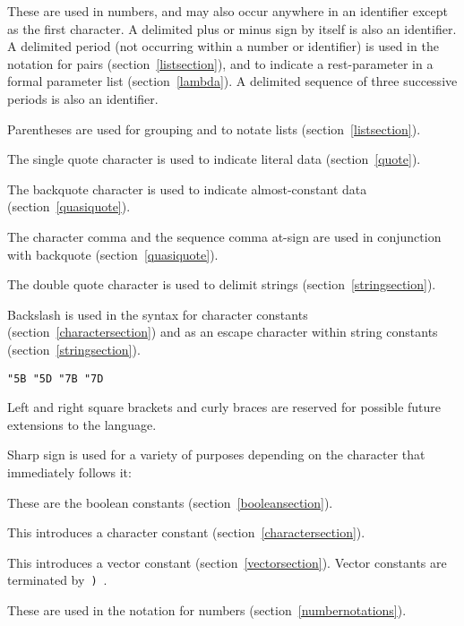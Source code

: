 \begin{description}{}{}

\item[{\tt.\ + -}]
These are used in numbers, and may also occur anywhere in an identifier
except as the first character.  A delimited plus or minus sign by itself
is also an identifier.
A delimited period (not occurring within a number or identifier) is used
in the notation for pairs (section~\ref{listsection}), and to indicate a
rest-parameter in a  formal parameter list (section~\ref{lambda}).
A delimited sequence of three successive periods is also an identifier.

\item[\tt( )]
Parentheses are used for grouping and to notate lists
(section~\ref{listsection}).

\item[\singlequote]
The single quote character is used to indicate literal data (section~\ref{quote}).

\item[\backquote]
The backquote character is used to indicate almost-constant
data (section~\ref{quasiquote}).

\item[\tt, ,@]
The character comma and the sequence comma at-sign are used in conjunction
with backquote (section~\ref{quasiquote}).

\item[\tt"]
The double quote character is used to delimit strings (section~\ref{stringsection}).

\item[\backwhack]
Backslash is used in the syntax for character constants
(section~\ref{charactersection}) and as an escape character within string
constants (section~\ref{stringsection}).

\hbox{\tt \char"5B{} \char"5D{} \char"7B{} \char"7D}
\item[\copy0]
Left and right square brackets and curly braces
are reserved for possible future extensions to the language.

\item[\sharpsign] Sharp sign is used for a variety of purposes depending on
the character that immediately follows it:

\item[\schtrue{} \schfalse{}]
These are the boolean constants (section~\ref{booleansection}).

\item[\sharpsign\backwhack]
This introduces a character constant (section~\ref{charactersection}).

\item[\sharpsign\tt(]
This introduces a vector constant (section~\ref{vectorsection}).  Vector constants
are terminated by~{\tt)}~.

\item[{\tt\#e \#i \#b \#o \#d \#x}]
These are used in the notation for numbers (section~\ref{numbernotations}).

\end{description}
